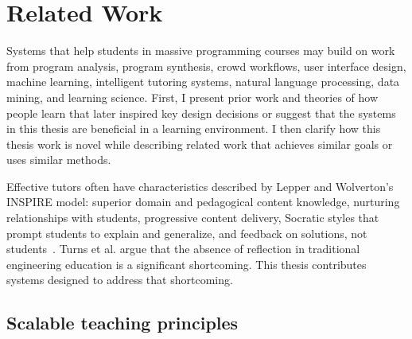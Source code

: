 \chapter{Related Work}\label{chapter:relatedwork}



Systems that help students in massive programming courses may build on work from program analysis, program synthesis, crowd workflows, user interface design, machine learning, intelligent tutoring systems, natural language processing, data mining, and learning science. First, I present prior work and theories of how people learn that later inspired key design decisions or suggest that the systems in this thesis are beneficial in a learning environment. I then clarify how this thesis work is novel while describing related work that achieves similar goals or uses similar methods. %

Effective tutors often have characteristics described by Lepper and Wolverton's INSPIRE model: superior domain and pedagogical content knowledge, nurturing relationships with students, progressive content delivery, Socratic styles that prompt students to explain and generalize, and feedback on solutions, not students~\cite{wood2012role}. Turns et al. \cite{asee} argue that the absence of reflection in traditional engineering education is a significant shortcoming. This thesis contributes systems designed to address that shortcoming.

\section{Scalable teaching principles}




